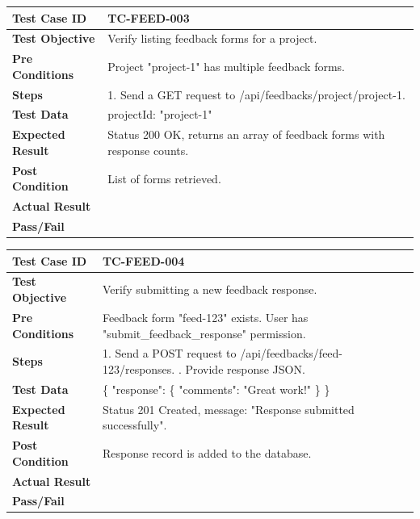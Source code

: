 \begin{longtable}{|p{}|p{}|}
\hline
\textbf{Test Case ID} & TC-FEED-003 \\ \hline
\textbf{Test Objective} & Verify listing feedback forms for a project. \\ \hline
\textbf{Pre Conditions} & Project "project-1" has multiple feedback forms. \\ \hline
\textbf{Steps} & 
1. Send a GET request to /api/feedbacks/project/project-1. \\ \hline
\textbf{Test Data} & projectId: "project-1" \\ \hline
\textbf{Expected Result} & Status 200 OK, returns an array of feedback forms with response counts. \\ \hline
\textbf{Post Condition} & List of forms retrieved. \\ \hline
\textbf{Actual Result} &  \\ \hline
\textbf{Pass/Fail} &  \\ \hline
\end{longtable}

\begin{longtable}{|p{}|p{}|}
\hline
\textbf{Test Case ID} & TC-FEED-004 \\ \hline
\textbf{Test Objective} & Verify submitting a new feedback response. \\ \hline
\textbf{Pre Conditions} & Feedback form "feed-123" exists. User has "submit_feedback_response" permission. \\ \hline
\textbf{Steps} & 
1. Send a POST request to /api/feedbacks/feed-123/responses. \newline
2. Provide response JSON. \\ \hline
\textbf{Test Data} & \{ "response": \{ "comments": "Great work!" \} \} \\ \hline
\textbf{Expected Result} & Status 201 Created, message: "Response submitted successfully". \\ \hline
\textbf{Post Condition} & Response record is added to the database. \\ \hline
\textbf{Actual Result} &  \\ \hline
\textbf{Pass/Fail} &  \\ \hline
\end{longtable}

